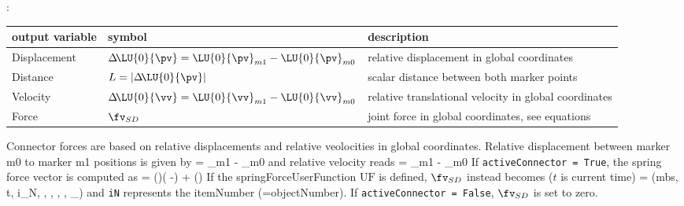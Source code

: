 :
\begin{center}
\footnotesize
\begin{longtable}{| p{5cm} | p{5cm} | p{6cm} |} 
\hline
\bf output variable & \bf symbol & \bf description \\ \hline
Displacement & $\Delta\! \LU{0}{\pv} = \LU{0}{\pv}_{m1} - \LU{0}{\pv}_{m0}$ & relative displacement in global coordinates\\ \hline
Distance & $L=|\Delta\! \LU{0}{\pv}|$ & scalar distance between both marker points\\ \hline
Velocity & $\Delta\! \LU{0}{\vv} = \LU{0}{\vv}_{m1} - \LU{0}{\vv}_{m0}$ & relative translational velocity in global coordinates\\ \hline
Force & $\fv_{SD}$ & joint force in global coordinates, see equations\\ \hline
\end{longtable}
\end{center}
 \noindent
    \finishTable
    Connector forces are based on relative displacements and relative veolocities in global coordinates.
    Relative displacement between marker m0 to marker m1 positions is given by
    \be \label{eq_ObjectCartesianSpringDamper_deltaPos}
      \Delta\! = _{m1} - _{m0} \eqComma
    \ee
    and relative velocity reads
    \be
      \Delta\! = _{m1} - _{m0} \eqDot
    \ee
    If \texttt{activeConnector = True}, the spring force vector is computed as
    \be
       = \diag(\kv)\cdot(\Delta\! -) + \diag(\dv) \cdot \Delta\!  \eqDot
    \ee
    If the springForceUserFunction $\mathrm{UF}$ is defined, $\fv_{SD}$ instead becomes ($t$ is current time)
    \be
       = (mbs, t, i_N, \Delta\! , \Delta\! , \kv, \dv, \vv_{}) \eqComma
    \ee
    and \texttt{iN} represents the itemNumber (=objectNumber).
    If \texttt{activeConnector = False}, $\fv_{SD}$ is set to zero.

